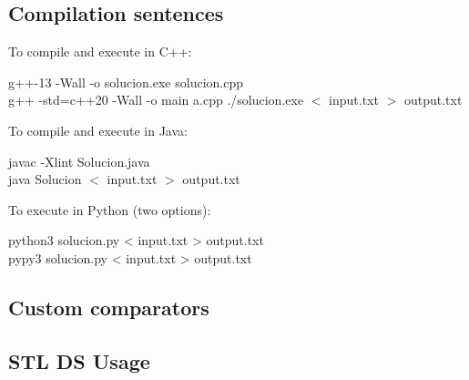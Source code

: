 \documentclass[letterpaper,landscape]{article}
\begin{document}
\subsection{Compilation sentences}

To compile and execute in C++:

\begin{mdframed}[style=terminal]
\ttfamily\upshape\color{bashLetterColor}\footnotesize
g++-13 -Wall -o solucion.exe solucion.cpp \\
g++ -std=c++20 -Wall -o main a.cpp
./solucion.exe $<$ input.txt $>$ output.txt
\end{mdframed}

To compile and execute in Java:

\begin{mdframed}[style=terminal]
\ttfamily\upshape\color{bashLetterColor}\footnotesize
javac -Xlint Solucion.java \\
java Solucion $<$ input.txt $>$ output.txt
\end{mdframed}

To execute in Python (two options):

\begin{mdframed}[style=terminal]
\ttfamily\upshape\color{bashLetterColor}\footnotesize
python3 solucion.py < input.txt > output.txt\\
pypy3 solucion.py < input.txt > output.txt
\end{mdframed}

\subsection{Custom comparators}



\subsection{STL DS Usage}
\end{document}
